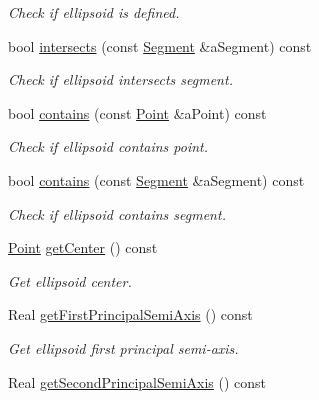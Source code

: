 \begin{DoxyCompactItemize}
\begin{DoxyCompactList}\small\item\em Check if ellipsoid is defined. \end{DoxyCompactList}\item 
bool \hyperlink{classlibrary_1_1math_1_1geom_1_1d3_1_1objects_1_1_ellipsoid_a6d447b106d193af47c6b201f7e01bd26}{intersects} (const \hyperlink{classlibrary_1_1math_1_1geom_1_1d3_1_1objects_1_1_segment}{Segment} \&a\+Segment) const
\begin{DoxyCompactList}\small\item\em Check if ellipsoid intersects segment. \end{DoxyCompactList}\item 
bool \hyperlink{classlibrary_1_1math_1_1geom_1_1d3_1_1objects_1_1_ellipsoid_ae54cb74c4e6445988ac4d78e00288dd2}{contains} (const \hyperlink{classlibrary_1_1math_1_1geom_1_1d3_1_1objects_1_1_point}{Point} \&a\+Point) const
\begin{DoxyCompactList}\small\item\em Check if ellipsoid contains point. \end{DoxyCompactList}\item 
bool \hyperlink{classlibrary_1_1math_1_1geom_1_1d3_1_1objects_1_1_ellipsoid_a4b0c41a41fbd8f158da26825f04c47d5}{contains} (const \hyperlink{classlibrary_1_1math_1_1geom_1_1d3_1_1objects_1_1_segment}{Segment} \&a\+Segment) const
\begin{DoxyCompactList}\small\item\em Check if ellipsoid contains segment. \end{DoxyCompactList}\item 
\hyperlink{classlibrary_1_1math_1_1geom_1_1d3_1_1objects_1_1_point}{Point} \hyperlink{classlibrary_1_1math_1_1geom_1_1d3_1_1objects_1_1_ellipsoid_a646be2506950d250db0fb6610979bb46}{get\+Center} () const
\begin{DoxyCompactList}\small\item\em Get ellipsoid center. \end{DoxyCompactList}\item 
Real \hyperlink{classlibrary_1_1math_1_1geom_1_1d3_1_1objects_1_1_ellipsoid_a8219b05b4c6afcd71e915d10b6129baf}{get\+First\+Principal\+Semi\+Axis} () const
\begin{DoxyCompactList}\small\item\em Get ellipsoid first principal semi-\/axis. \end{DoxyCompactList}\item 
Real \hyperlink{classlibrary_1_1math_1_1geom_1_1d3_1_1objects_1_1_ellipsoid_abdc2cc0bed7d473f0d4f572afd0de054}{get\+Second\+Principal\+Semi\+Axis} () const

\end{DoxyCompactItemize}
